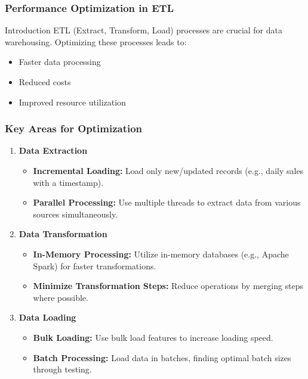 \documentclass[aspectratio=169]{beamer}
\begin{document}
\begin{frame}[fragile]
    \frametitle{Performance Optimization in ETL}
    \begin{block}{Introduction}
        ETL (Extract, Transform, Load) processes are crucial for data warehousing. Optimizing these processes leads to:
        \begin{itemize}
            \item Faster data processing
            \item Reduced costs
            \item Improved resource utilization
        \end{itemize}
    \end{block}
\end{frame}

\begin{frame}[fragile]
    \frametitle{Key Areas for Optimization}
    \begin{enumerate}
        \item \textbf{Data Extraction}
        \begin{itemize}
            \item \textbf{Incremental Loading:} Load only new/updated records (e.g., daily sales with a timestamp).
            \item \textbf{Parallel Processing:} Use multiple threads to extract data from various sources simultaneously.
        \end{itemize}

        \item \textbf{Data Transformation}
        \begin{itemize}
            \item \textbf{In-Memory Processing:} Utilize in-memory databases (e.g., Apache Spark) for faster transformations.
            \item \textbf{Minimize Transformation Steps:} Reduce operations by merging steps where possible.
        \end{itemize}

        \item \textbf{Data Loading}
        \begin{itemize}
            \item \textbf{Bulk Loading:} Use bulk load features to increase loading speed.
            \item \textbf{Batch Processing:} Load data in batches, finding optimal batch sizes through testing.
        \end{itemize}
    \end{enumerate}
\end{frame}
\end{document}
